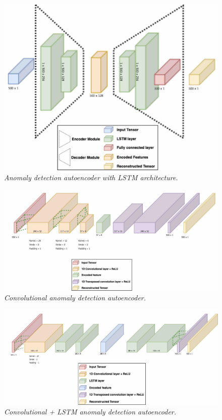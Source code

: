 \begin{figure}[H]
  \centering
  \caption[Anomaly detection autoencoder with LSTM architecture.]{\emph{Anomaly detection autoencoder with LSTM architecture.}} \label{fig:autoencoder_lstm}
  \includegraphics[scale = 0.22]{figures/autoencoder_lstm.jpg}
\end{figure}

\begin{figure}[H]
  \centering
  \caption[Convolutional anomaly detection autoencoder.]{\emph{Convolutional anomaly detection autoencoder.}} \label{fig:autoencoder_cnn}
  \includegraphics[scale = 0.15]{figures/autoencoder_cnn.jpg}
\end{figure}

\begin{figure}[H]
  \centering
  \caption[Convolutional + LSTM anomaly detection  autoencoder.]{\emph{Convolutional + LSTM anomaly detection  autoencoder.}} \label{fig:autoencoder_cnnlstm}
  \includegraphics[scale = 0.13]{figures/autoencoder_cnnlstm.jpg}
\end{figure}

